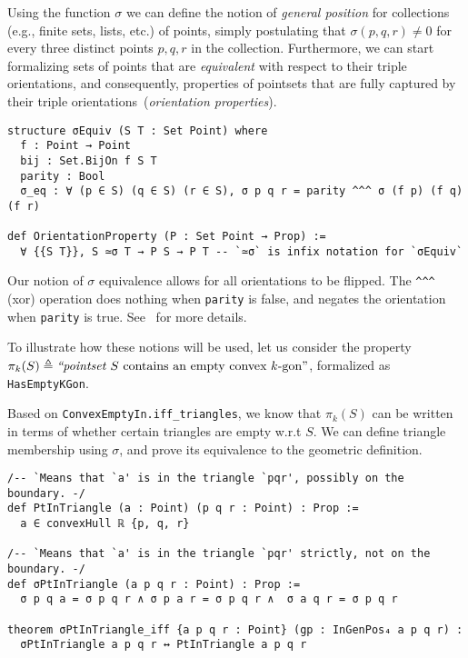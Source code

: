 Using the function $\sigma$ we can define the notion of \emph{general position} for collections (e.g., finite sets, lists, etc.) of points, simply postulating that $\sigma(p, q, r) \neq 0$ for every three distinct points $p, q, r$ in the collection.
Furthermore, we can start formalizing sets of points that are \emph{equivalent} with respect to their triple orientations, and consequently, properties of pointsets that are fully captured by their triple orientations~(\emph{orientation properties}).
% 
\begin{lstlisting}
structure σEquiv (S T : Set Point) where
  f : Point → Point
  bij : Set.BijOn f S T
  parity : Bool
  σ_eq : ∀ (p ∈ S) (q ∈ S) (r ∈ S), σ p q r = parity ^^^ σ (f p) (f q) (f r)

def OrientationProperty (P : Set Point → Prop) :=
  ∀ {{S T}}, S ≃σ T → P S → P T -- `≃σ` is infix notation for `σEquiv`
\end{lstlisting}

Our notion of \(\sigma\) equivalence allows for all orientations to be flipped.
The \lstinline{^^^} (xor) operation does nothing when \lstinline{parity} is false,
and negates the orientation when \lstinline{parity} is true.
See~ for more details.

To illustrate how these notions will be used, let us consider the property
\(
  \pi_k(S) \triangleq \text{\em ``pointset } S \text{ contains an empty convex } k\text{-gon''}
\), formalized as \lstinline|HasEmptyKGon|.

Based on \lstinline|ConvexEmptyIn.iff_triangles|, we know that $\pi_k(S)$ can be written
in terms of whether certain triangles are empty w.r.t $S$.
We can define triangle membership using $\sigma$,
and prove its equivalence to the geometric definition.
\begin{lstlisting}
/-- `Means that `a' is in the triangle `pqr', possibly on the boundary. -/
def PtInTriangle (a : Point) (p q r : Point) : Prop :=
  a ∈ convexHull ℝ {p, q, r}

/-- `Means that `a' is in the triangle `pqr' strictly, not on the boundary. -/
def σPtInTriangle (a p q r : Point) : Prop :=
  σ p q a = σ p q r ∧ σ p a r = σ p q r ∧  σ a q r = σ p q r

theorem σPtInTriangle_iff {a p q r : Point} (gp : InGenPos₄ a p q r) :
  σPtInTriangle a p q r ↔ PtInTriangle a p q r
\end{lstlisting}

